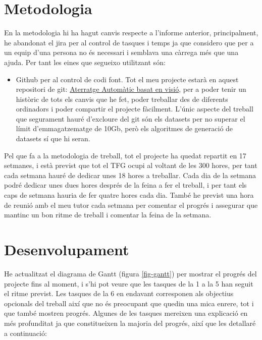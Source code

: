 \documentclass[10pt,a4paper,twocolumn,twoside]{article}
\begin{document}
\section{Metodologia}
En la metodologia hi ha hagut canvis respecte a l'informe anterior, principalment, he abandonat el jira per al control de tasques i temps ja que considero que per a un equip d'una persona no és necessari i semblava una càrrega més que una ajuda. Per tant les eines que segueixo utilitzant són:
\begin{itemize}
    \item{Github per al control de codi font. Tot el meu projecte estarà en aquest repositori de git:
    \href{https://github.com/NarcisNogue/Aterratge-automatic-d-avions-model-basat-en-visio}{Aterratge Automàtic basat en visió}, per a poder tenir un històric de tots els canvis que he fet, poder treballar des de diferents ordinadors i poder compartir el projecte fàcilment. L'únic aspecte del treball que segurament hauré d'excloure del git són els datasets per no superar el límit d'emmagatzematge de 10Gb, però els algoritmes de generació de datasets sí que hi seran.}
\end{itemize}

Pel que fa a la metodologia de treball, tot el projecte ha quedat repartit en 17 setmanes, i està previst que tot el TFG ocupi al voltant de les 300 hores, per tant cada setmana hauré de dedicar unes 18 hores a treballar. Cada dia de la setmana podré dedicar unes dues hores després de la feina a fer el treball, i per tant els caps de setmana hauria de fer quatre hores cada dia. També he previst una hora de reunió amb el meu tutor cada setmana per comentar el progrés i assegurar que mantinc un bon ritme de treball i comentar la feina de la setmana.

\section{Desenvolupament}
He actualitzat el diagrama de Gantt (figura \ref{fig-gantt}) per mostrar el progrés del projecte fins al moment, i s'hi pot veure que les tasques de
la 1 a la 5 han seguit el ritme previst. Les tasques de la 6 en endavant corresponen als objectius opcionals del treball així que no és
preocupant que quedin una mica enrere, tot i que també mostren progrés. Algunes de les tasques mereixen una explicació en més profunditat 
ja que constitueixen la majoria del progrés, així que les detallaré a continuació:
\end{document}

